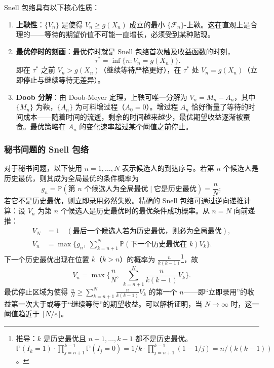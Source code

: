Snell 包络具有以下核心性质：
\begin{enumerate}[noitemsep]
  \item \textbf{上鞅性}：$\{V_n\}$ 是使得 $V_n \geqslant g(X_n)$ 成立的最小 $\{\mathcal{F}_n\}$-上鞅。这在直观上是合理的——等待的期望价值不可能一直增长，必须受到某种贴现。
  \item \textbf{最优停时的刻画}：最优停时就是 Snell 包络首次触及收益函数的时刻，
  \begin{equation}\label{eq:opt_stop}
    \tau^* = \inf\{n: V_n = g(X_n)\}.
  \end{equation}
  即在 $\tau^*$ 之前 $V_n > g(X_n)$（继续等待严格更好），在 $\tau^*$ 处 $V_n = g(X_n)$（立即停止与继续等待无差异）。
  \item \textbf{Doob 分解}：由 Doob-Meyer 定理，上鞅可唯一分解为 $V_n = M_n - A_n$，其中 $\{M_n\}$ 为鞅，$\{A_n\}$ 为可料增过程（$A_0 = 0$）。增过程 $A_n$ 恰好衡量了等待的时间成本——随着时间的流逝，剩余的时间越来越少，最优期望收益逐渐被蚕食。最优策略在 $A_n$ 的变化速率超过某个阈值之前停止。
\end{enumerate}

\subsubsection{秘书问题的 Snell 包络}

对于秘书问题，以下使用 $n=1,\dots,N$ 表示候选人的到达序号。若第 $n$ 个候选人是历史最优，则其成为全局最优的条件概率为
\begin{equation}
  g_n = \mathbb{P}(\text{第 } n \text{ 个候选人为全局最优}\mid \text{它是历史最优}) = \frac{n}{N};
\end{equation}
若它不是历史最优，则立即录用必然失败。精确的 Snell 包络可通过逆向递推计算：设 $V_n$ 为第 $n$ 个候选人是历史最优时的最优条件成功概率。从 $n=N$ 向前递推：
\begin{align}
  V_N &= 1 \quad (\text{最后一个候选人若为历史最优，则必为全局最优}), \\
  V_n &= \max\Big\{g_n,\; \sum_{k=n+1}^{N}
  \mathbb{P}(\text{下一个历史最优在 } k) V_k\Big\}.
\end{align}
下一个历史最优出现在位置 $k$（$k > n$）的概率为 $\frac{n}{k(k-1)}$\footnote{推导：$k$ 是历史最优且 $n+1,\dots,k-1$ 都不是历史最优。$\mathbb{P}(I_k = 1) \cdot \prod_{j=n+1}^{k-1} \mathbb{P}(I_j = 0) = 1/k \cdot \prod_{j=n+1}^{k-1} (1 - 1/j) = n/(k(k-1))$。}，故
\begin{equation}\label{eq:snell_rec}
  V_n = \max\Bigg\{\frac{n}{N},\; \sum_{k=n+1}^{N}
  \frac{n}{k(k-1)} V_k\Bigg\}.
\end{equation}
最优停止区域为使得 $\frac{n}{N} \geqslant \sum_{k=n+1}^{N} \frac{n}{k(k-1)} V_k$ 的第一个 $n$——即``立即录用''的收益第一次大于或等于``继续等待''的期望收益。可以解析证明，当 $N \to \infty$ 时，这一阈值趋近于 $\lceil N/e \rceil$\cite{gilbert1966recognizing}。

